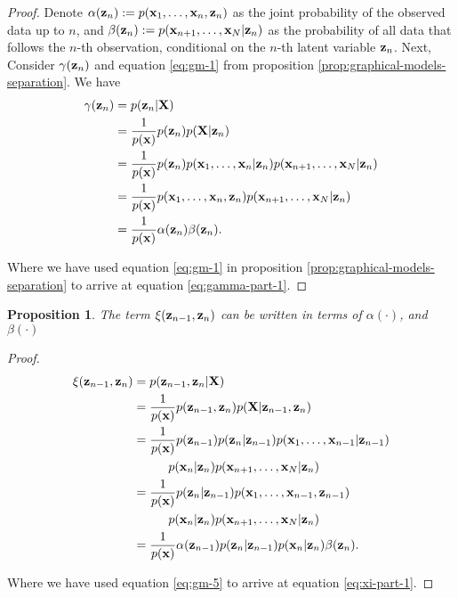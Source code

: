 \documentclass[11pt]{article}
\numberwithin{equation}{section}
\newcommand{\x}{{\bf x}}
\newcommand{\X}{{\bf X}}
\newcommand{\z}{{\bf z}}
\newtheorem{proposition}{Proposition}[section]
\begin{document}
\begin{proof}
Denote $\alpha(\z_n) := p(\x_1, \ldots, \x_n, \z_n)$ as the joint probability of the observed data up to $n$, and $\beta(\z_n) := p(\x_{n+1}, \ldots, \x_N\vert \z_n)$ as the probability of all data that follows the $n$-th observation, conditional on the $n$-th latent variable $\z_n$. Next, Consider  $\gamma(\z_n)$ and equation \eqref{eq:gm-1} from proposition \ref{prop:graphical-models-separation}. We have
\begin{align}
	\gamma(\z_n) &= p(\z_n \vert {\bf X})\\
					  &= \frac{1}{p(\x)}p(\z_n)p({\bf X} \vert \z_n)\\
					  &= \frac{1}{p(\x)} p(\z_n) p(\x_1, \ldots, \x_n\vert \z_n) p(\x_{n+1}, \ldots, \x_N\vert \z_n) \label{eq:gamma-part-1}\\
					  &= \frac{1}{p(\x)}p(\x_1, \ldots, \x_n, \z_n) p(\x_{n+1}, \ldots, \x_N\vert \z_n)\\
					  &= \frac{1}{p(\x)}\alpha(\z_n)\beta(\z_n).
\end{align}

Where we have used equation \eqref{eq:gm-1} in proposition \ref{prop:graphical-models-separation} to arrive at equation \eqref{eq:gamma-part-1}.
\end{proof}


\begin{proposition}\label{prop:xi-factorisation}
	The term $\xi(\z_{n-1}, \z_n)$ can be written in terms of $\alpha({\cdot})$, and $\beta(\cdot)$
\end{proposition}

\begin{proof}
	\begin{align}
		\xi(\z_{n-1}, \z_{n}) &= p(\z_{n-1}, \z_{n} \vert \X)\\
		&= \frac{1}{p(\x)}p(\z_{n-1}, \z_{n}) p(\X \vert \z_{n-1}, \z_{n})\\
		&= \frac{1}{p(\x)} p(\z_{n-1}) p(\z_{n} \vert \z_{n-1}) p(\x_1, \ldots, \x_{n-1}\vert \z_{n-1}) \nonumber \\
			&\hspace{1cm} p(\x_n\vert \z_n) p(\x_{n+1}, \ldots, \x_N \vert \z_n) \label{eq:xi-part-1}\\
		&= \frac{1}{p(\x)} p(\z_{n} \vert \z_{n-1}) p(\x_1, \ldots, \x_{n-1}, \z_{n-1}) \nonumber \\
			&\hspace{1cm} p(\x_n\vert \z_n) p(\x_{n+1}, \ldots, \x_N \vert \z_n)\\
		&= \frac{1}{p(\x)} \alpha(\z_{n-1}) p(\z_{n} \vert \z_{n-1}) p(\x_n \vert \z_n) \beta(\z_n).
	\end{align}
	
Where we have used equation \eqref{eq:gm-5} to arrive at equation \eqref{eq:xi-part-1}.
\end{proof}
\end{document}
